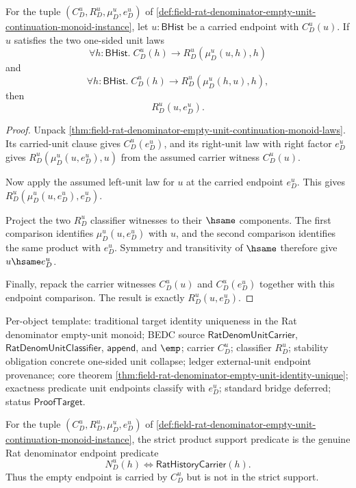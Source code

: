 \begin{theorem}
\label{thm:field-rat-denominator-empty-unit-identity-unique}
For the tuple $(C_D^u,R_D^u,\mu_D^u,e_D^u)$ of
\autoref{def:field-rat-denominator-empty-unit-continuation-monoid-instance},
let $u:\mathsf{BHist}$ be a carried endpoint with $C_D^u(u)$. If $u$
satisfies the two one-sided unit laws
$$
\forall h:\mathsf{BHist}.\; C_D^u(h)\to R_D^u(\mu_D^u(u,h),h)
$$
and
$$
\forall h:\mathsf{BHist}.\; C_D^u(h)\to R_D^u(\mu_D^u(h,u),h),
$$
then
$$
R_D^u(u,e_D^u).
$$
\end{theorem}
\begin{proof}
Unpack
\autoref{thm:field-rat-denominator-empty-unit-continuation-monoid-laws}. Its
carried-unit clause gives $C_D^u(e_D^u)$, and its right-unit law with right
factor $e_D^u$ gives $R_D^u(\mu_D^u(u,e_D^u),u)$ from the assumed carrier
witness $C_D^u(u)$.

Now apply the assumed left-unit law for $u$ at the carried endpoint $e_D^u$.
This gives $R_D^u(\mu_D^u(u,e_D^u),e_D^u)$.

Project the two $R_D^u$ classifier witnesses to their $\hsame$ components. The
first comparison identifies $\mu_D^u(u,e_D^u)$ with $u$, and the second
comparison identifies the same product with $e_D^u$. Symmetry and transitivity
of $\hsame$ therefore give $u\hsame e_D^u$.

Finally, repack the carrier witnesses $C_D^u(u)$ and $C_D^u(e_D^u)$ together
with this endpoint comparison. The result is exactly $R_D^u(u,e_D^u)$.
\end{proof}

Per-object template: traditional target identity uniqueness in the Rat
denominator empty-unit monoid; BEDC source $\mathsf{RatDenomUnitCarrier}$,
$\mathsf{RatDenomUnitClassifier}$, $\mathsf{append}$, and $\emp$; carrier
$C_D^u$; classifier $R_D^u$; stability obligation concrete one-sided unit
collapse; ledger external-unit endpoint provenance; core theorem
\autoref{thm:field-rat-denominator-empty-unit-identity-unique}; exactness
predicate unit endpoints classify with $e_D^u$; standard bridge deferred;
status $\mathsf{ProofTarget}$.

\begin{definition}
\label{def:field-rat-denominator-empty-unit-strict-product-support}
For the tuple $(C_D^u,R_D^u,\mu_D^u,e_D^u)$ of
\autoref{def:field-rat-denominator-empty-unit-continuation-monoid-instance},
the strict product support predicate is the genuine Rat denominator endpoint
predicate
$$
N_D^u(h)\Longleftrightarrow\mathsf{RatHistoryCarrier}(h).
$$
Thus the empty endpoint is carried by $C_D^u$ but is not in the strict support.
\end{definition}

